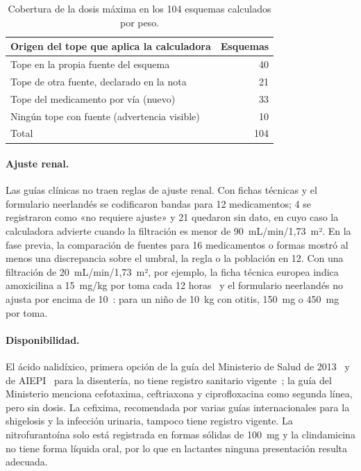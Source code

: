 \documentclass[11pt,a4paper]{article}
\begin{document}
\begin{table}[htbp]
\centering
\caption{Cobertura de la dosis máxima en los 104 esquemas calculados por peso.}
\label{tab:topes}
\small
\begin{tabular}{@{}lr@{}}
\toprule
Origen del tope que aplica la calculadora & Esquemas \\
\midrule
Tope en la propia fuente del esquema & 40 \\
Tope de otra fuente, declarado en la nota & 21 \\
Tope del medicamento por vía (nuevo) & 33 \\
Ningún tope con fuente (advertencia visible) & 10 \\
\midrule
Total & 104 \\
\bottomrule
\end{tabular}
\end{table}

\paragraph{Ajuste renal.} Las guías clínicas no traen reglas de ajuste renal. Con fichas técnicas y el formulario neerlandés se codificaron bandas para 12 medicamentos; 4 se registraron como «no requiere ajuste» y 21 quedaron sin dato, en cuyo caso la calculadora advierte cuando la filtración es menor de 90~mL/min/1,73~m². En la fase previa, la comparación de fuentes para 16 medicamentos o formas mostró al menos una discrepancia sobre el umbral, la regla o la población en 12. Con una filtración de 20~mL/min/1,73~m², por ejemplo, la ficha técnica europea indica amoxicilina a 15~mg/kg por toma cada 12 horas~\citep{emaamoxil} y el formulario neerlandés no ajusta por encima de 10~\citep{kinderformularium}: para un niño de 10~kg con otitis, 150~mg o 450~mg por toma.

\paragraph{Disponibilidad.} El ácido nalidíxico, primera opción de la guía del Ministerio de Salud de 2013~\citep{gpc8} y de AIEPI~\citep{aiepi2012} para la disentería, no tiene registro sanitario vigente~\citep{invima}; la guía del Ministerio menciona cefotaxima, ceftriaxona y ciprofloxacina como segunda línea, pero sin dosis. La cefixima, recomendada por varias guías internacionales para la shigelosis y la infección urinaria, tampoco tiene registro vigente. La nitrofurantoína solo está registrada en formas sólidas de 100~mg y la clindamicina no tiene forma líquida oral, por lo que en lactantes ninguna presentación resulta adecuada.
\end{document}
